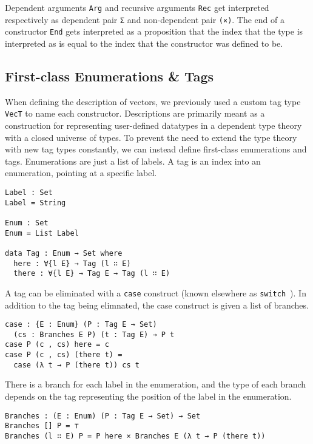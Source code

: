 \documentclass[preprint,nonatbib]{sigplanconf}
\begin{document}
Dependent arguments {\tt Arg} and recursive arguments
{\tt Rec} get interpreted respectively as dependent pair
{\tt Σ} and non-dependent pair {\tt (×)}. The end of a constructor
{\tt End} gets interpreted as a proposition that the index that the
type is interpreted as is equal to the index that the constructor was
defined to be.

\subsection{First-class Enumerations \& Tags}

When defining the description of vectors, we previously used a custom
tag type {\tt VecT} to name each constructor. Descriptions are
primarily meant as a construction for representing user-defined
datatypes in a dependent type theory with a closed universe of types.
To prevent the need to extend the type theory with new tag types
constantly, we can instead define first-class enumerations and tags.
Enumerations are just a list of labels. A tag is an index into an
enumeration, pointing at a specific label.

\begin{verbatim}
Label : Set
Label = String

Enum : Set
Enum = List Label

data Tag : Enum → Set where
  here : ∀{l E} → Tag (l ∷ E)
  there : ∀{l E} → Tag E → Tag (l ∷ E)
\end{verbatim}

A tag can be eliminated with a {\tt case} construct (known elsewhere as
{\tt switch}~\citep{Chapman:2010:GAL:1932681.1863547,dagand:phd}).
In addition to the tag being elimnated, the case construct is given a
list of branches.

\begin{verbatim}
case : {E : Enum} (P : Tag E → Set)
  (cs : Branches E P) (t : Tag E) → P t
case P (c , cs) here = c
case P (c , cs) (there t) =
  case (λ t → P (there t)) cs t
\end{verbatim}

There is a branch for each label in the enumeration, and the type of
each branch depends on the tag representing the position of the label
in the enumeration.

\begin{verbatim}
Branches : (E : Enum) (P : Tag E → Set) → Set
Branches [] P = ⊤
Branches (l ∷ E) P = P here × Branches E (λ t → P (there t))
\end{verbatim}
\end{document}
